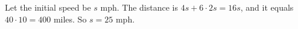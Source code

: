 Let the initial speed be $s$ mph. The distance is $4s+6\cdot2s=16s$, and it equals $40\cdot10=400$ miles. So $s=\boxed{25}$ mph.
